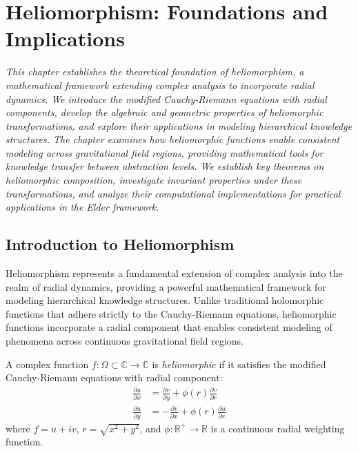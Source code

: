 \chapter{Heliomorphism: Foundations and Implications}

\textit{This chapter establishes the theoretical foundation of heliomorphism, a mathematical framework extending complex analysis to incorporate radial dynamics. We introduce the modified Cauchy-Riemann equations with radial components, develop the algebraic and geometric properties of heliomorphic transformations, and explore their applications in modeling hierarchical knowledge structures. The chapter examines how heliomorphic functions enable consistent modeling across gravitational field regions, providing mathematical tools for knowledge transfer between abstraction levels. We establish key theorems on heliomorphic composition, investigate invariant properties under these transformations, and analyze their computational implementations for practical applications in the Elder framework.}

\section{Introduction to Heliomorphism}

Heliomorphism represents a fundamental extension of complex analysis into the realm of radial dynamics, providing a powerful mathematical framework for modeling hierarchical knowledge structures. Unlike traditional holomorphic functions that adhere strictly to the Cauchy-Riemann equations, heliomorphic functions incorporate a radial component that enables consistent modeling of phenomena across continuous gravitational field regions.

\begin{definition}
A complex function $f: \Omega \subset \mathbb{C} \rightarrow \mathbb{C}$ is \textit{heliomorphic} if it satisfies the modified Cauchy-Riemann equations with radial component:
\begin{align}
\frac{\partial u}{\partial x} &= \frac{\partial v}{\partial y} + \phi(r)\frac{\partial v}{\partial r} \\
\frac{\partial u}{\partial y} &= -\frac{\partial v}{\partial x} + \phi(r)\frac{\partial u}{\partial r}
\end{align}
where $f = u + iv$, $r = \sqrt{x^2 + y^2}$, and $\phi: \mathbb{R}^+ \rightarrow \mathbb{R}$ is a continuous radial weighting function.
\end{definition}


